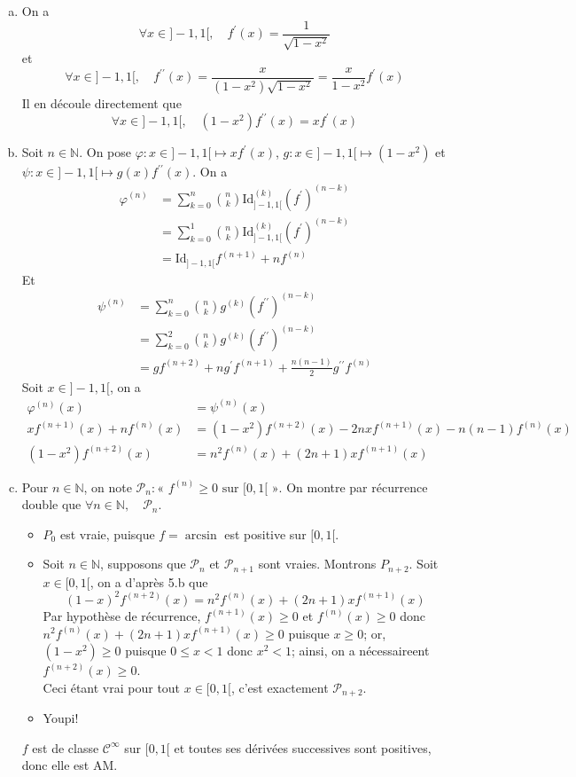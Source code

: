 \documentclass[17pt]{article}
\def\N{\mathbb N}
\def\Cinf{\mathcal{C}^{\infty}}
\def\Id#1{\text{Id}_{#1}}
\begin{document}
\begin{enumerate}
\begin{enumerate}[a)]
			\item On a \[\forall x\in]-1,1[,\quad f^\prime(x)=\frac1{\sqrt{1-x^2}}\]
			et \[\forall x\in]-1,1[,\quad f^{\prime\prime}(x)=\frac{x}{(1-x^2)\sqrt{1-x^2}}=\frac x{1-x^2}f^\prime(x)\]
			Il en découle directement que \[\forall x\in]-1,1[,\quad (1-x^2)f^{\prime\prime}(x)=xf^\prime(x)\]
			\item Soit $n\in\N$. On pose $\varphi:x\in]-1,1[\mapsto xf^\prime(x)$, $g:x\in]-1,1[\mapsto (1-x^2)$ et $\psi:x\in]-1,1[\mapsto g(x)f^{\prime\prime}(x)$. On a 
			\begin{align*}
				\varphi^{(n)} &= \sum_{k=0}^n\binom nk\Id{]-1,1[}^{(k)}(f^\prime)^{(n-k)}\\
							  &= \sum_{k=0}^1\binom nk\Id{]-1,1[}^{(k)}(f^\prime)^{(n-k)}\\
							  &= \Id{]-1,1[}f^{(n+1)}+nf^{(n)}
			\end{align*}
			Et
			\begin{align*}
				\psi^{(n)} 	&= \sum_{k=0}^n\binom nkg^{(k)}(f^{\prime\prime})^{(n-k)}\\
							&= \sum_{k=0}^2\binom nkg^{(k)}(f^{\prime\prime})^{(n-k)}\\
							&= gf^{(n+2)}+ng^\prime f^{(n+1)}+\frac{n(n-1)}2g^{\prime\prime}f^{(n)}
			\end{align*}
			Soit $x\in]-1,1[$, on a
			\begin{align*}
				\varphi^{(n)}(x) &= \psi^{(n)}(x)\\
				xf^{(n+1)}(x)+nf^{(n)}(x)&= (1-x^2)f^{(n+2)}(x)-2nxf^{(n+1)}(x)-n(n-1)f^{(n)}(x)\\
				(1-x^2)f^{(n+2)}(x) &= n^2f^{(n)}(x)+(2n+1)xf^{(n+1)}(x)
			\end{align*}
			\item Pour $n\in\N$, on note $\mathcal{P}_n:\text{« }f^{(n)}\geq0\text{ sur }[0,1[\text{ »}$. On montre par récurrence double que $\forall n\in\N,\quad \mathcal{P}_n$.
			\begin{itemize}
				\item $P_0$ est vraie, puisque $f=\arcsin$ est positive sur $[0,1[$.
				\item Soit $n\in\N$, supposons que $\mathcal{P}_n$ et $\mathcal{P}_{n+1}$ sont vraies. Montrons $P_{n+2}$. Soit $x\in[0,1[$, on a d'après 5.b que \[(1-x)^2f^{(n+2)}(x)=n^2f^{(n)}(x)+(2n+1)xf^{(n+1)}(x)\]
				Par hypothèse de récurrence, $f^{(n+1)}(x)\geq 0$ et $f^{(n)}(x)\geq 0$ donc $n^2f^{(n)}(x)+(2n+1)xf^{(n+1)}(x)\geq 0$ puisque $x\geq 0$; or, $(1-x^2)\geq 0$ puisque $0\leq x< 1$ donc $x^2<1$; ainsi, on a nécessaireent $f^{(n+2)}(x)\geq 0$.\\
				Ceci étant vrai pour tout $x\in[0,1[$, c'est exactement $\mathcal P_{n+2}$. 
				\item Youpi!
			\end{itemize}
			$f$ est de classe $\Cinf$ sur $[0,1[$ et toutes ses dérivées successives sont positives, donc elle est AM.
		\end{enumerate}
	\end{enumerate}
\end{document}
